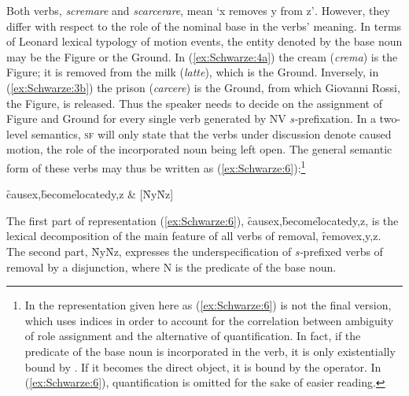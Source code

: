 \documentclass[output=paper]{langsci/langscibook}
\begin{document}
Both verbs, \emph{scremare} and \emph{scarcerare}, mean `x removes y from z'\emph{.} However, they differ with respect to the role of the nominal base in the verbs' meaning. In terms of Leonard 
lexical typology of motion events, the entity denoted by the base noun may be the Figure or the Ground. In (\ref{ex:Schwarze:4a}) the cream (\emph{crema}) is the Figure; it is removed from the milk (\emph{latte}), which is the Ground.
Inversely, in (\ref{ex:Schwarze:3b}) the prison (\emph{carcere}) is the Ground, from which Giovanni Rossi, the Figure, is released. Thus the speaker needs to decide on the assignment of Figure and Ground for every single verb generated by N\textrightarrow{}V \emph{s-}prefixation. In a two-level semantics, \textsc{sf} will only state that the verbs under discussion denote caused motion, the role of the incorporated noun being left open. The general semantic form of these verbs may thus be written as (\ref{ex:Schwarze:6}):\footnote{In %
\citet{Heusinger2006} %
%
the representation given here as (\ref{ex:Schwarze:6}) is not the final version, which uses indices in order to account for the correlation between ambiguity of role assignment and the alternative of quantification. In fact, if the predicate of the base noun is incorporated in the verb, it is only existentially bound by \E. If it becomes the direct object, it is bound by the \lda operator. In (\ref{ex:Schwarze:6}), quantification is omitted for the sake of easier reading.}

\ea\label{ex:Schwarze:6} \f{cause}{x,\f{become}{\neg\f{located}{y,z}}} \;\&\; {[}\f{N}{y}\ou\f{N}{z}{]}
\z %

The first part of representation (\ref{ex:Schwarze:6}), \f{cause}{x,\f{become}{\neg\f{located}{y,z}}},
is the lexical decomposition of the main feature of all verbs of removal, \f{remove}{x,y,z}. The second part, \f{N}{y}\ou\f{N}{z}, expresses the underspecification of \emph{s-}prefixed verbs of removal by a disjunction, where N is the predicate of the base noun.
\end{document}

